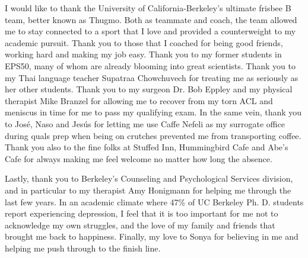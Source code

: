 \documentclass{ucbthesis}
\begin{document}
\begin{frontmatter}
\begin{acknowledgements}
I would like to thank the University of California-Berkeley's ultimate frisbee B team, better known as Thugmo. Both as teammate and coach, the team allowed me to stay connected to a sport that I love and provided a counterweight to my academic pursuit. Thank you to those that I coached for being good friends, working hard and making my job easy. Thank you to my former students in EPS50, many of whom are already blooming into great scientists. Thank you to my Thai language teacher Supatraa Chowchuvech for treating me as seriously as her other students. Thank you to my surgeon Dr. Bob Eppley and my physical therapist Mike Branzel for allowing me to recover from my torn ACL and meniscus in time for me to pass my qualifying exam. In the same vein, thank you to Jos\'{e}, Naso and Jes\'{u}s for letting me use Caffe Nefeli as my surrogate office during quals prep when being on crutches prevented me from transporting coffee. Thank you also to the fine folks at Stuffed Inn, Hummingbird Cafe and Abe's Cafe for always making me feel welcome no matter how long the absence.

Lastly, thank you to Berkeley's Counseling and Psychological Services division, and in particular to my therapist Amy Honigmann for helping me through the last few years. In an academic climate where 47\% of UC Berkeley Ph. D. students report experiencing depression, I feel that it is too important for me not to acknowledge my own struggles, and the love of my family and friends that brought me back to happiness. Finally, my love to Sonya for believing in me and helping me push through to the finish line.

\end{acknowledgements}

\end{frontmatter}

\pagestyle{headings}






%


\printbibliography
\end{document}
